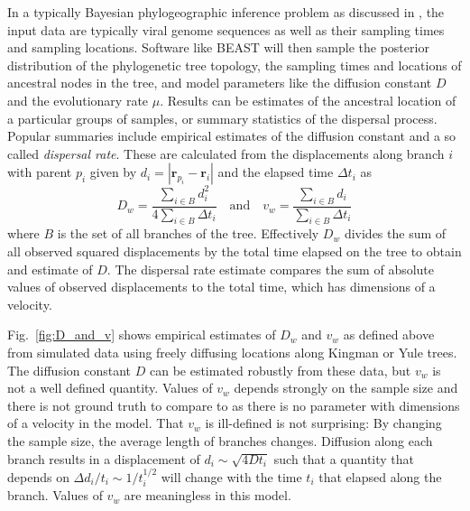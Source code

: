 \documentclass[aps,rmp, onecolumn]{revtex4}
\newcommand{\rvec}{\mathbf{r}}
\begin{document}
In a typically Bayesian phylogeographic inference problem as discussed in \citet{pybus_unifying_2012}, the input data are typically viral genome sequences as well as their sampling times and sampling locations.
Software like BEAST will then sample the posterior distribution of the phylogenetic tree topology, the sampling times and locations of ancestral nodes in the tree, and model parameters like the diffusion constant $D$ and the evolutionary rate $\mu$.
Results can be estimates of the ancestral location of a particular groups of samples, or summary statistics of the dispersal process.
Popular summaries include empirical estimates of the diffusion constant and a so called \emph{dispersal rate}. These are calculated from the displacements along branch $i$ with parent $p_i$ given by $d_i = |\rvec_{p_i} - \rvec_{i}|$ and the elapsed time $\Delta t_i$ as
\begin{equation}
    D_w = \frac{\sum_{i\in B}d_i^2}{4\sum_{i\in B} \Delta t_i} \quad \mathrm{and}  \quad v_w = \frac{\sum_{i\in B} d_i}{\sum_{i\in B} \Delta t_i}
\end{equation}
where $B$ is the set of all branches of the tree.
Effectively $D_w$ divides the sum of all observed squared displacements by the total time elapsed on the tree to obtain and estimate of $D$.
The dispersal rate estimate compares the sum of absolute values of observed displacements to the total time, which has dimensions of a velocity.

Fig.~\ref{fig:D_and_v} shows empirical estimates of $D_w$ and $v_w$ as defined above from simulated data using freely diffusing locations along Kingman or Yule trees.
The diffusion constant $D$ can be estimated robustly from these data, but $v_w$ is not a well defined quantity.
Values of $v_w$ depends strongly on the sample size and there is not ground truth to compare to as there is no parameter with dimensions of a velocity in the model.
That $v_w$ is ill-defined is not surprising: By changing the sample size, the average length of branches changes. Diffusion along each branch results in a displacement of $d_i \sim \sqrt{4Dt_i}$ such that a quantity that depends on $\Delta d_i / t_i \sim 1/t_i^{1/2}$ will change with the time $t_i$ that elapsed along the branch.
Values of $v_w$ are meaningless in this model.
\end{document}
